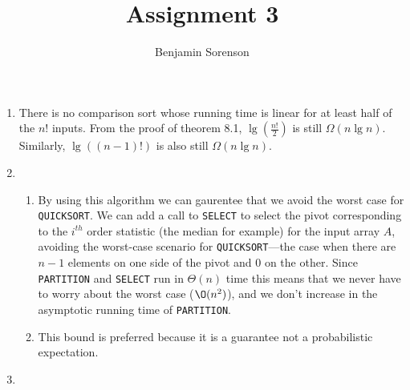 \documentclass[11pt]{article}
\begin{document}
\author{Benjamin Sorenson} \title{Assignment 3}
\maketitle

\begin{enumerate}[label=\bfseries Question \arabic*:]
\item There is no comparison sort whose running time is linear for at
  least half of the \(n!\)
  inputs. From the proof of theorem 8.1,
  \(\lg\left(\frac{n!}{2}\right)\)
  is still \(\Omega(n \lg n)\).
  Similarly, \(\lg\left(\left(n-1\right)!\right)\)
  is also still \(\Omega(n \lg n)\).
\item
  \begin{enumerate}
  \item By using this algorithm we can gaurentee that we avoid the
    worst case for \texttt{QUICKSORT}.  We can add a call to
    \texttt{SELECT} to select the pivot corresponding to the
    \(i^{th}\)
    order statistic (the median for example) for the input array
    \(A\),
    avoiding the worst-case scenario for \texttt{QUICKSORT}---the case
    when there are \(n-1\)
    elements on one side of the pivot and \(0\)
    on the other.  Since \texttt{PARTITION} and \texttt{SELECT} run in
    \(\Theta(n)\)
    time this means that we never have to worry about the worst case
    (\(\O(n^2)\)),
    and we don't increase in the asymptotic running time of
    \texttt{PARTITION}.
  \item This bound is preferred because it is a guarantee not a
    probabilistic expectation.
  \end{enumerate}
\item
\end{enumerate}
\end{document}
